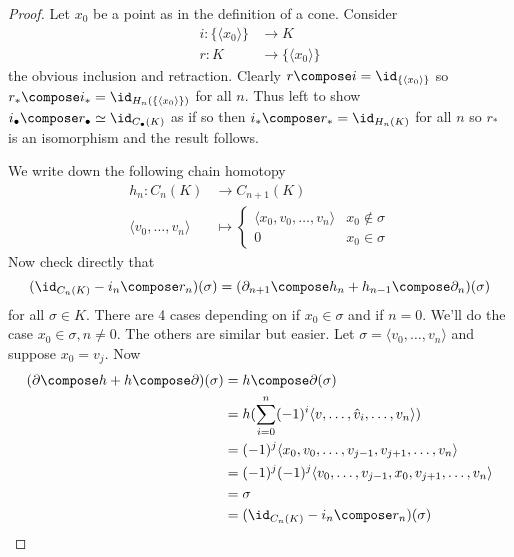 \documentclass[a4paper]{article}
\renewcommand{\b}{\partial} %
\begin{document}
\begin{proof}
  Let \(x_0\) be a point as in the definition of a cone. Consider
  \begin{align*}
    i: \{\langle x_0 \rangle\} &\to K \\
    r: K &\to \{\langle x_0 \rangle\}
  \end{align*}
  the obvious inclusion and retraction. Clearly \(r \compose i = \id_{\{\langle x_0 \rangle\}}\) so \(r_* \compose i_* = \id_{H_n(\{\langle x_0 \rangle\})}\) for all \(n\). Thus left to show \(i_\bullet \compose r_\bullet \simeq \id_{C_\bullet(K)}\) as if so then \(i_* \compose r_* = \id_{H_n(K)}\) for all \(n\) so \(r_*\) is an isomorphism and the result follows.

  We write down the following chain homotopy
  \begin{align*}
    h_n: C_n(K) &\to C_{n + 1}(K) \\
    \langle v_0, \dots, v_n \rangle &\mapsto
                                      \begin{cases}
                                        \langle x_0, v_0, \dots, v_n \rangle & x_0 \notin \sigma \\
                                        0 & x_0 \in \sigma
                                      \end{cases}
  \end{align*}
  Now check directly that
  \[
    (\id_{C_n(K)} - i_n \compose r_n)(\sigma) = (\b_{n + 1} \compose h_n + h_{n - 1} \compose \b_n)(\sigma)
  \]
  for all \(\sigma \in K\). There are 4 cases depending on if \(x_0 \in \sigma\) and if \(n = 0\). We'll do the case \(x_0 \in \sigma, n \neq 0\). The others are similar but easier. Let \(\sigma = \langle v_0, \dots, v_n \rangle\) and suppose \(x_0 = v_j\). Now
  \begin{align*}
    (\b \compose h + h \compose \b)(\sigma)
    &= h \compose \b(\sigma) \\
    &= h(\sum_{i = 0}^n (-1)^i \langle v, \dots, \hat v_i, \dots, v_n \rangle) \\
    &= (-1)^j \langle x_0, v_0, \dots, v_{j - 1}, v_{j + 1}, \dots, v_n \rangle \\
    &= (-1)^j (-1)^j \langle v_0, \dots, v_{j - 1}, x_0, v_{j + 1}, \dots, v_n \rangle \\
    &= \sigma \\
    &= (\id_{C_n(K)} - i_n \compose r_n)(\sigma)
  \end{align*}
\end{proof}
\end{document}
